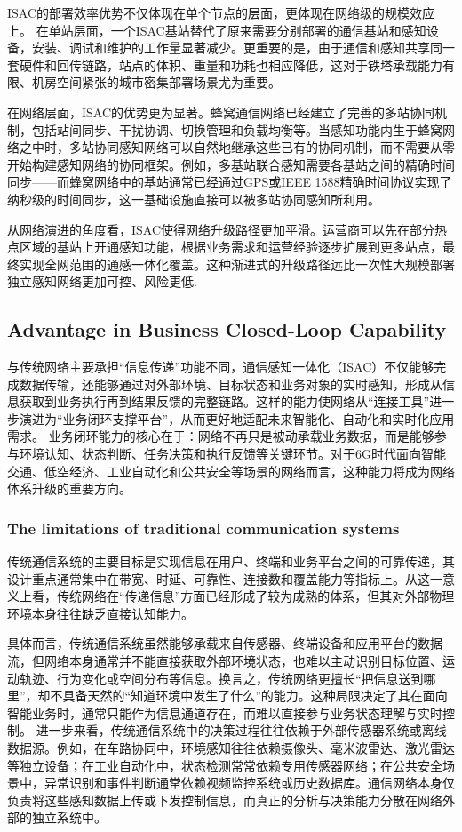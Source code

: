 ISAC的部署效率优势不仅体现在单个节点的层面，更体现在网络级的规模效应上。
在单站层面，一个ISAC基站替代了原来需要分别部署的通信基站和感知设备，安装、调试和维护的工作量显著减少。更重要的是，由于通信和感知共享同一套硬件和回传链路，站点的体积、重量和功耗也相应降低，这对于铁塔承载能力有限、机房空间紧张的城市密集部署场景尤为重要。

在网络层面，ISAC的优势更为显著。蜂窝通信网络已经建立了完善的多站协同机制，包括站间同步、干扰协调、切换管理和负载均衡等。当感知功能内生于蜂窝网络之中时，多站协同感知网络可以自然地继承这些已有的协同机制，而不需要从零开始构建感知网络的协同框架。例如，多基站联合感知需要各基站之间的精确时间同步——而蜂窝网络中的基站通常已经通过GPS或IEEE 1588精确时间协议实现了纳秒级的时间同步，这一基础设施直接可以被多站协同感知所利用。

从网络演进的角度看，ISAC使得网络升级路径更加平滑。运营商可以先在部分热点区域的基站上开通感知功能，根据业务需求和运营经验逐步扩展到更多站点，最终实现全网范围的通感一体化覆盖。这种渐进式的升级路径远比一次性大规模部署独立感知网络更加可控、风险更低.

\subsection{Advantage in Business Closed-Loop Capability}
\label{subsec:ch1-isac-core value-closed loop}

与传统网络主要承担“信息传递”功能不同，通信感知一体化（ISAC）不仅能够完成数据传输，还能够通过对外部环境、目标状态和业务对象的实时感知，形成从信息获取到业务执行再到结果反馈的完整链路。这样的能力使网络从“连接工具”进一步演进为“业务闭环支撑平台”，从而更好地适配未来智能化、自动化和实时化应用需求。
业务闭环能力的核心在于：网络不再只是被动承载业务数据，而是能够参与环境认知、状态判断、任务决策和执行反馈等关键环节。对于6G时代面向智能交通、低空经济、工业自动化和公共安全等场景的网络而言，这种能力将成为网络体系升级的重要方向。

\subsubsection{The limitations of traditional communication systems}
\label{subsubsec:ch1-isac-core value-closed loop-communication}
传统通信系统的主要目标是实现信息在用户、终端和业务平台之间的可靠传递，其设计重点通常集中在带宽、时延、可靠性、连接数和覆盖能力等指标上。从这一意义上看，传统网络在“传递信息”方面已经形成了较为成熟的体系，但其对外部物理环境本身往往缺乏直接认知能力。

具体而言，传统通信系统虽然能够承载来自传感器、终端设备和应用平台的数据流，但网络本身通常并不能直接获取外部环境状态，也难以主动识别目标位置、运动轨迹、行为变化或空间分布等信息。换言之，传统网络更擅长“把信息送到哪里”，却不具备天然的“知道环境中发生了什么”的能力。这种局限决定了其在面向智能业务时，通常只能作为信息通道存在，而难以直接参与业务状态理解与实时控制。
进一步来看，传统通信系统中的决策过程往往依赖于外部传感器系统或离线数据源。例如，在车路协同中，环境感知往往依赖摄像头、毫米波雷达、激光雷达等独立设备；在工业自动化中，状态检测常常依赖专用传感器网络；在公共安全场景中，异常识别和事件判断通常依赖视频监控系统或历史数据库。通信网络本身仅负责将这些感知数据上传或下发控制信息，而真正的分析与决策能力分散在网络外部的独立系统中。


